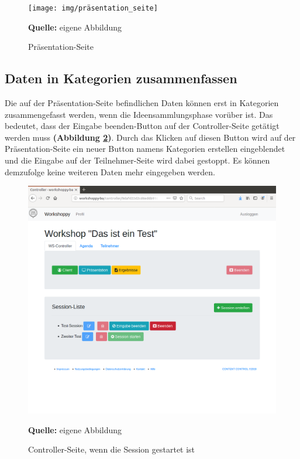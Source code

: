\begin{figure}[H]
  \begin{center}
    \texttt{[image: img/präsentation\_seite]}
	\caption{Präsentation-Seite} 
	\footnotesize\sffamily\textbf{Quelle:} eigene Abbildung
	\label{fig:Präsentation-Seite final}
  \end{center}   
\end{figure}

\newpage
\subsection{Daten in Kategorien zusammenfassen}
\label{subsec:Daten in Kategorien zusammenfassen}
Die auf der Präsentation-Seite befindlichen Daten können erst in Kategorien zusammengefasst werden, wenn die Ideensammlungsphase vorüber ist. Das bedeutet, dass der \glqq Eingabe beenden\grqq{}-Button auf der Controller-Seite getätigt werden muss \textbf{(Abbildung \ref{fig:controller-Seite mit session final})}. Durch das Klicken auf diesen Button wird auf der Präsentation-Seite ein neuer Button namens \glqq Kategorien erstellen\grqq{} eingeblendet und die Eingabe auf der Teilnehmer-Seite wird dabei gestoppt. Es können demzufolge keine weiteren Daten mehr eingegeben werden. 

\bigskip
\begin{figure}[H]
  \begin{center}
    \includegraphics[scale=0.35]{img/controller_seite1}
	\caption{Controller-Seite, wenn die Session gestartet ist} 
	\footnotesize\sffamily\textbf{Quelle:} eigene Abbildung
	\label{fig:controller-Seite mit session final}
  \end{center}   
\end{figure}

